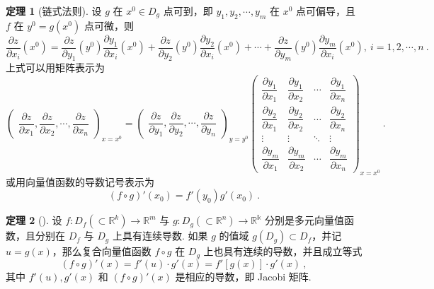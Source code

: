 \documentclass[zihao=-4,linespread=1.8,UTF8,nothm]{aytony_base}
\theoremstyle{definition}
\newtheorem{theorem}{\indent\heiti\textbf{定理}}[subsection]
\begin{document}
\begin{theorem}[链式法则]
    设 $g$ 在 $x^0 \in D_g$ 点可到，即 ${y}_1, {y}_2, \cdots, {y}_{m}$ 在 $x^0$ 点可偏导，且 $f$ 在 $y^0 = g(x^0)$ 点可微，则 $$
        \dfrac{\partial z}{\partial x_i}(x^0) = \dfrac{\partial z}{\partial y_1}(y^0)\dfrac{\partial y_1}{\partial x_i}(x^0) + \dfrac{\partial z}{\partial y_2}(y^0)\dfrac{\partial y_2}{\partial x_i}(x^0) + \cdots + \dfrac{\partial z}{\partial y_m}(y^0)\dfrac{\partial y_m}{\partial x_i}(x^0),\ i = 1, 2, \cdots, n\ .
    $$ 上式可以用矩阵表示为 $$
        \left(
        \begin{matrix}
            \dfrac{\partial z}{\partial x_1}, \dfrac{\partial z}{\partial x_2}, \cdots, \dfrac{\partial z}{\partial x_{n}}\end{matrix}
        \right)_{x = x^0} = \left(
        \begin{matrix}\dfrac{\partial z}{\partial y_1}, \dfrac{\partial z}{\partial y_2}, \cdots, \dfrac{\partial z}{\partial y_{n}}
        \end{matrix}
        \right)_{y = y^0}\left(
        \begin{matrix}
            \dfrac{\partial y_1}{\partial x_1} & \dfrac{\partial y_1}{\partial x_2} & \cdots & \dfrac{\partial y_1}{\partial x_n} \\
            \dfrac{\partial y_2}{\partial x_1} & \dfrac{\partial y_2}{\partial x_2} & \cdots & \dfrac{\partial y_2}{\partial x_n} \\
            \vdots                             &
            \vdots                             &
            \ddots                             &
            \vdots                                                                                                                \\
            \dfrac{\partial y_m}{\partial x_1} & \dfrac{\partial y_m}{\partial x_2} & \cdots & \dfrac{\partial y_m}{\partial x_n}
        \end{matrix}
        \right)_{x = x^0}\ .
    $$ 或用向量值函数的导数记号表示为 $$
        (f \circ g)'(x_0) = f'(y_0)g'(x_0)\ .
    $$
\end{theorem}

\begin{theorem}[]
    设 $f:D_f(\subset \mathbb{R}^k) \to \mathbb{R}^m$ 与 $g:D_g(\subset \mathbb{R}^n) \to \mathbb{R^k}$ 分别是多元向量值函数，且分别在 $D_f$ 与 $D_g$ 上具有连续导数. 如果 $g$ 的值域 $g(D_g) \subset D_f$，并记 $u = g(x)$，那么复合向量值函数 $f \circ g$ 在 $D_g$ 上也具有连续的导数，并且成立等式 $$
        (f \circ g)'(x) = f'(u)\cdot g'(x) = f'[g(x)] \cdot g'(x)\ ,
    $$ 其中 $f'(u), g'(x)$ 和 $(f \circ g)'(x)$ 是相应的导数，即 Jacobi 矩阵.
\end{theorem}
\end{document}
